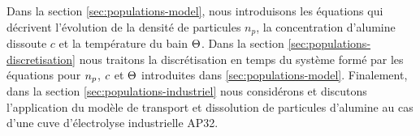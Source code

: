 Dans la section \ref{sec:populations-model}, nous introduisons les
équations qui décrivent l'évolution de la densité de particules $n_p$,
la concentration d'alumine dissoute $c$ et la température du bain
$\Theta$. Dans la section \ref{sec:populations-discretisation}
nous traitons la discrétisation en temps du système formé par les
équations pour $n_p$, $c$ et $\Theta$
introduites dans \ref{sec:populations-model}. Finalement, dans la
section \ref{sec:populations-industriel} nous considérons et discutons
l'application du modèle de transport et dissolution de particules
d'alumine au cas d'une cuve d'électrolyse industrielle AP32.
